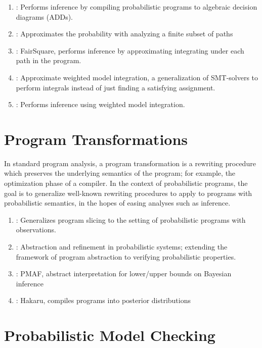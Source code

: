 \documentclass{article}
\begin{document}
\begin{enumerate}
\item \citep{Claret2013}: Performs inference by compiling probabilistic programs
  to algebraic decision diagrams (ADDs).
\item \citep{Sankaranarayanan:2013}: Approximates the probability with analyzing
  a finite subset of paths
\item \citep{Albarghouthi2017}: FairSquare, performs inference by approximating
  integrating under each path in the program.
\item \citep{BelleIJCAI15}: Approximate weighted model integration, a generalization of
  SMT-solvers to perform integrals instead of just finding a satisfying assignment.
\item \citep{Chistikov2015}: Performs inference using weighted model integration.
\end{enumerate}

\section{Program Transformations}
In standard program analysis, a program transformation is a rewriting procedure
which preserves the underlying semantics of the program; for example, the
optimization phase of a compiler. In the context of probabilistic programs, the
goal is to generalize well-known rewriting procedures to apply to programs with
probabilistic semantics, in the hopes of easing analyses such as inference.

\begin{enumerate}
\item \citep{Hur2014}: Generalizes program slicing to the setting of
  probabilistic programs with observations.
\item \citep{McIver2005}: Abstraction and refinement in probabilistic systems;
  extending the framework of program abstraction to verifying probabilistic
  properties.
\item \citep{wang2018pmaf}: PMAF, abstract interpretation for lower/upper bounds
  on Bayesian inference
\item \citep{narayanan2016probabilistic}: Hakaru, compiles programs into
  posterior distributions
\end{enumerate}


\section{Probabilistic Model Checking}
\end{document}
